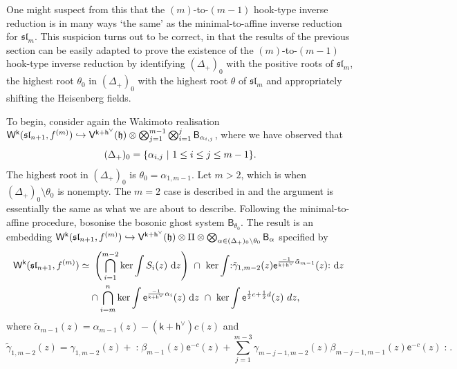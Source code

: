 \documentclass[10pt,a4paper]{amsart}
\numberwithin{equation}{section}
\renewcommand{\cong}{\simeq} %
\newcommand{\dd}{\mathrm{d}}   %
\newcommand{\ee}{\mathsf{e}}   %
\newcommand{\kk}{\mathsf{k}}   %
\DeclarePairedDelimiter{\brac}{\lparen}{\rparen}   %
\DeclarePairedDelimiter{\set}{\lbrace}{\rbrace}
\newcommand{\no}[1]{\mathopen{:} #1 \mathclose{:}} %
\newcommand{\alg}[1]{\mathfrak{#1}}  %
\newcommand{\VOA}[1]{\mathsf{#1}}    %
\newcommand{\SLA}[2]{\alg{#1}_{#2}}                      %
\newcommand{\slnpone}{\SLA{sl}{n+1}}
\newcommand{\cartan}{\mathfrak{h}}
\newcommand{\cox}{\mathsf{h}}                                        %
\newcommand{\dcox}{\coroot{\cox}}                                    %
\newcommand{\proots}{\Delta_+}                                       %
\newcommand{\sroot}[1]{\alpha_{#1}}                                  %
\newcommand{\tsroot}[1]{\tilde{\alpha}_{#1}}                         %
\newcommand{\hroot}{\theta}                                          %
\newcommand{\coroot}[1]{#1^{\vee}}                                   %
\newcommand{\fhook}[1]{f^{(#1)}}                                  %
\newcommand{\Wsymb}{\VOA{W}}
\newcommand{\uaffvoa}[2]{\VOA{V}^{#1}\brac{#2}}                   %
\newcommand{\bgvoa}{\VOA{B}}                                      %
\newcommand{\uQHR}[3]{\Wsymb^{#1}\brac{#2,#3}}                    %
\theoremstyle{plain}
\begin{document}
One might suspect from this that the $(m)$-to-$(m-1)$ hook-type inverse reduction is in many ways `the same' as the minimal-to-affine inverse reduction for $\SLA{sl}{m}$. This suspicion turns out to be correct, in that the results of the previous section can be easily adapted to prove the existence of the $(m)$-to-$(m-1)$ hook-type inverse reduction by identifying $(\proots)_0$ with the positive roots of $\SLA{sl}{m}$, the highest root $\hroot_0$ in $(\proots)_0$ with the highest root $\hroot$ of $\SLA{sl}{m}$ and appropriately shifting the Heisenberg fields.

To begin, consider again the Wakimoto realisation $\uQHR{\kk}{\slnpone}{\fhook{m}} \hookrightarrow \uaffvoa{\kk+\dcox}{\cartan} \otimes \bigotimes_{j=1}^{m-1}\bigotimes_{i=1}^{j} \bgvoa_{\sroot{i,j}}$, where we have observed that 
%
\begin{equation}
    (\proots)_0 = \set{\sroot{i,j} \ \vert \ 1 \leq i \leq j \leq m-1}.
\end{equation}
%
The highest root in $(\proots)_0$ is $\hroot_0=\sroot{1,m-1}$. Let $m >2$, which is when $(\proots)_0 \setminus \hroot_0$ is nonempty. The $m=2$ case is described in \cite{Feh21c} and the argument is essentially the same as what we are about to describe. Following the minimal-to-affine procedure, bosonise the bosonic ghost system $\bgvoa_{\hroot_0}$. The result is an embedding $\uQHR{\kk}{\slnpone}{\fhook{m}} \hookrightarrow \uaffvoa{\kk+\dcox}{\cartan} \otimes \Pi \otimes \bigotimes_{\alpha \in (\proots)_0 \setminus \hroot_0} \bgvoa_\alpha$ specified by
%
\begin{align} \label{eq:HookToHookIntermediate}
     \uQHR{\kk}{\slnpone}{\fhook{m}} \cong&\ \left( \bigcap_{i=1}^{m-2} \textup{ker} \int S_i(z) \ \dd z \right)\ \cap \ \textup{ker} \int \no{\tilde{\gamma}_{1,m-2}(z) \ee^{\frac{-1}{\kk+\dcox} \tsroot{m-1}}(z)} \ \dd z\ \\
     &\cap \bigcap_{i=m}^{n} \textup{ker} \int \ee^{\frac{-1}{\kk+\dcox} \alpha_{i}}(z) \ \dd z\ \cap\  \textup{ker} \int \ee^{\frac{1}{2}c + \frac{1}{2}d}(z) \ dz, \notag
\end{align}
%
where $\tsroot{m-1}(z) = \sroot{m-1}(z)-(\kk+\dcox)c(z)$ and 
%
\begin{equation}
    \tilde{\gamma}_{1,m-2}(z) = \gamma_{1,m-2}(z) + \no{ \beta_{m-1}(z)\ee^{-c}(z) + \sum_{j=1}^{m-3} \gamma_{m-j-1,m-2}(z) \beta_{m-j-1,m-1}(z)\ee^{-c}(z)}.
\end{equation}
\end{document}
